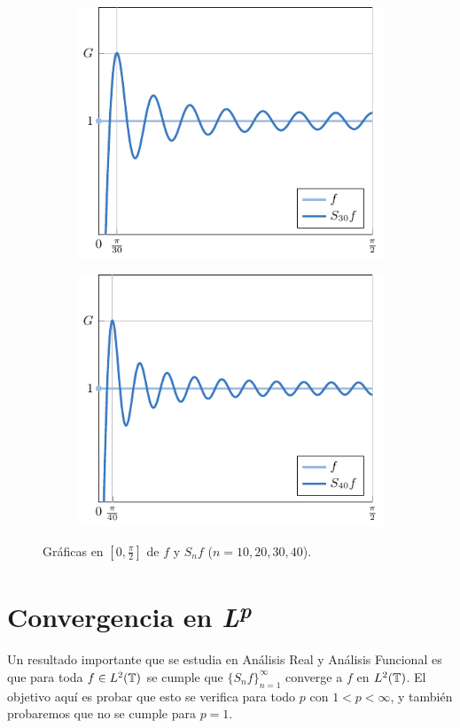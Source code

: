 \documentclass[a4paper, 12pt, oneside]{book}
\begin{document}
\begin{figure}[H]
\begin{subfigure}[b]{0.49\textwidth}
    \includegraphics{./plot7/main.pdf}
\end{subfigure}
\begin{subfigure}[b]{0.49\textwidth}
    \centering
    \includegraphics{./plot8/main.pdf}
\end{subfigure}
\caption{Gráficas en $[0,\frac{\pi}{2}]$ de $f$ y $S_nf$ ($n = 10,20,30,40$).}
\end{figure}

\chapter{Convergencia en \texorpdfstring{\textit{L\textsuperscript{p}}}{\textit{Lp}}}

Un resultado importante que se estudia en Análisis Real y Análisis Funcional es que para toda $f \in L^2(\mathbb T)$ se cumple que $\{S_nf\}_{n=1}^\infty$ converge a $f$ en $L^2(\mathbb T)$. El objetivo aquí es probar que esto se verifica para todo $p$ con $1 < p < \infty$, y también probaremos que no se cumple para $p = 1$. 
\end{document}
